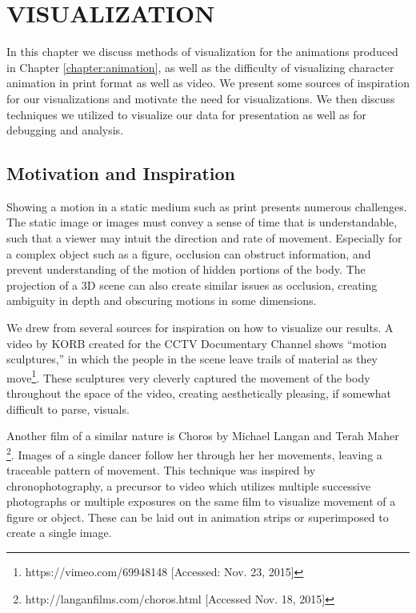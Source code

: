 
 
\chapter{VISUALIZATION}
\label{chapter:visualization}
In this chapter we discuss methods of visualization for the animations produced in Chapter \ref{chapter:animation}, as well as the difficulty of visualizing character animation in print format as well as video.  We present some sources of inspiration for our visualizations and motivate the need for visualizations.  We then discuss techniques we utilized to visualize our data for presentation as well as for debugging and analysis.

\section{Motivation and Inspiration}
\label{section:vis_insp}
Showing a motion in a static medium such as print presents numerous challenges.  The static image or images must convey a sense of time that is understandable, such that a viewer may intuit the direction and rate of movement.  Especially for a complex object such as a figure, occlusion can obstruct information, and prevent understanding of the motion of hidden portions of the body.  The projection of a 3D scene can also create similar issues as occlusion, creating ambiguity in depth and obscuring motions in some dimensions.

We drew from several sources for inspiration on how to visualize our results.  A video by KORB created for the CCTV Documentary Channel shows ``motion sculptures,'' in which the people in the scene leave trails of material as they move\footnote{https://vimeo.com/69948148 [Accessed: Nov. 23, 2015]}.  These sculptures very cleverly captured the movement of the body throughout the space of the video, creating aesthetically pleasing, if somewhat difficult to parse, visuals.

Another film of a similar nature is Choros by Michael Langan and Terah Maher \footnote{http://langanfilms.com/choros.html [Accessed Nov. 18, 2015]}.  Images of a single dancer follow her through her her movements, leaving a traceable pattern of movement.  This technique was inspired by chronophotography, a precursor to video which utilizes multiple successive photographs or multiple exposures on the same film to visualize movement of a figure or object.  These can be laid out in animation strips or superimposed to create a single image.

